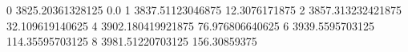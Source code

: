 0 3825.20361328125 0.0
1 3837.51123046875 12.3076171875
2 3857.313232421875 32.109619140625
4 3902.180419921875 76.976806640625
6 3939.5595703125 114.35595703125
8 3981.51220703125 156.30859375
